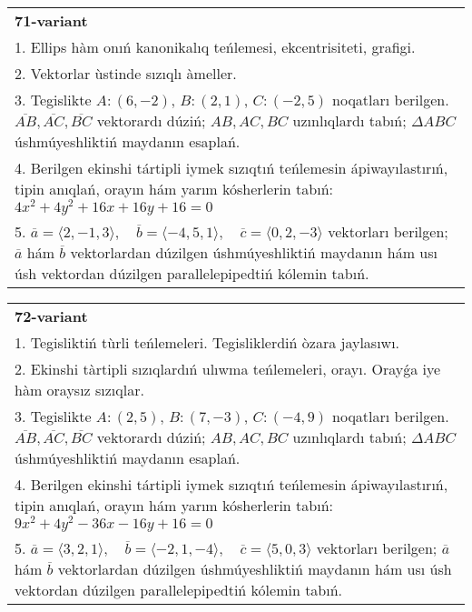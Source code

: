 \documentclass{article}
\begin{document}
\begin{tabular}{m{17cm}}
\textbf{71-variant}\\
1. Ellips hàm onıń kanonikalıq teńlemesi, ekcentrisiteti, grafigi.\\

2. Vektorlar ùstinde sızıqlı àmeller.\\

3. Tegislikte $A: (6, -2)$, $B: (2, 1)$, $C: (-2, 5)$ noqatları berilgen. $\overline{AB}, \overline{AC}, \overline{BC}$ vektorardı dúziń; $AB, AC, BC$ uzınlıqlardı tabıń; $\Delta ABC$ úshmúyeshliktiń maydanın esaplań. \\

4. Berilgen ekinshi tártipli iymek sızıqtıń teńlemesin ápiwayılastırıń, tipin anıqlań, orayın hám yarım kósherlerin tabıń: $4x^2+4y^2+16x+16y+16=0$\\

5. \(\overline{a} = \langle 2, -1, 3 \rangle, \quad \overline{b} = \langle -4, 5, 1 \rangle, \quad \overline{c} = \langle 0, 2, -3 \rangle\) vektorları berilgen; \(\overline{a}\) hám \(\overline{b}\) vektorlardan dúzilgen úshmúyeshliktiń maydanın hám usı úsh vektordan dúzilgen parallelepipedtiń kólemin tabıń.
\end{tabular}
\vspace{1cm}


\begin{tabular}{m{17cm}}
\textbf{72-variant}\\
1. Tegisliktiń tùrli teńlemeleri. Tegisliklerdiń òzara jaylasıwı.\\

2. Ekinshi tàrtipli sızıqlardıń ulıwma teńlemeleri, orayı. Orayǵa iye hàm oraysız sızıqlar.\\

3. Tegislikte $A: (2, 5)$, $B: (7, -3)$, $C: (-4, 9)$ noqatları berilgen. $\overline{AB}, \overline{AC}, \overline{BC}$ vektorardı dúziń; $AB, AC, BC$ uzınlıqlardı tabıń; $\Delta ABC$ úshmúyeshliktiń maydanın esaplań. \\

4. Berilgen ekinshi tártipli iymek sızıqtıń teńlemesin ápiwayılastırıń, tipin anıqlań, orayın hám yarım kósherlerin tabıń: $9x^2+4y^2-36x-16y+16=0$\\

5. \(\overline{a} = \langle 3, 2, 1 \rangle, \quad \overline{b} = \langle -2, 1, -4 \rangle, \quad \overline{c} = \langle 5, 0, 3 \rangle\) vektorları berilgen; \(\overline{a}\) hám \(\overline{b}\) vektorlardan dúzilgen úshmúyeshliktiń maydanın hám usı úsh vektordan dúzilgen parallelepipedtiń kólemin tabıń.
\end{tabular}
\vspace{1cm}
\end{document}
